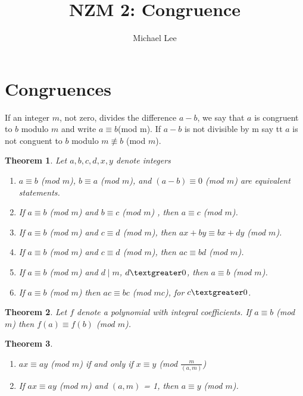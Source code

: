 \documentclass[11pt]{article} %
\title{NZM 2: Congruence}
\author{Michael Lee}
\date{} %
\newtheorem{theorem}{Theorem}[section]
\newenvironment{definition}[1][Definition]{\begin{trivlist}
\item[\hskip \labelsep {\bfseries #1}]}{\end{trivlist}}
\begin{document}
\maketitle

\section{Congruences}

\begin{definition}
	If an integer $m$, not zero, divides the difference $a - b$, we say that $a$ is congruent to $b$ modulo $m$ and write $a \equiv b $(mod m). If $a - b$ is not divisible by m say tt $a$ is not conguent to $b$ modulo $m \not\equiv b $ (mod $m$). 
\end{definition}

\begin{theorem}
	Let $a, b, c, d, x, y$ denote integers
	\begin{enumerate}
		\item $a \equiv b$ (mod $m$), $b \equiv a$ (mod $m$), and $ (a - b) \equiv 0$ (mod $m$) are equivalent statements. 
		\item If $a \equiv b$ (mod $m$) and $b \equiv c$ (mod $m$) , then $a \equiv c$ (mod $m$). 
		\item If $a \equiv b$ (mod $m$) and $c \equiv d$ (mod $m$), then $ ax + by \equiv bx + dy$ (mod $m$). 
		\item If $a \equiv b$ (mod $m$) and $c \equiv d$ (mod $m$), then $ac \equiv bd$ (mod $m$). 
		\item If $a \equiv b$ (mod $m$) and $d \mid m$, $d \textgreater 0$, then $a \equiv b$ (mod $m$). 
		\item If $a \equiv b$ (mod $m$)  then $ac \equiv bc$ (mod $mc$), for $c \textgreater 0$. 
	\end{enumerate}
\end{theorem}

\begin{theorem}
	Let $f$ denote a polynomial with integral coefficients. If $a \equiv b $ (mod $m$) then $f(a) \equiv f(b)$ (mod $m$). 
\end{theorem}

\begin{theorem}
	\begin{enumerate}
		\item $ax \equiv ay$ (mod $m$) if and only if $x \equiv y$ (mod $\frac{m}{(a, m)}$) 
		\item If $ax \equiv ay$ (mod $m$) and $(a, m)$ = 1, then $a \equiv y$ (mod $m$).
	\end{enumerate}
\end{theorem}
\end{document}
